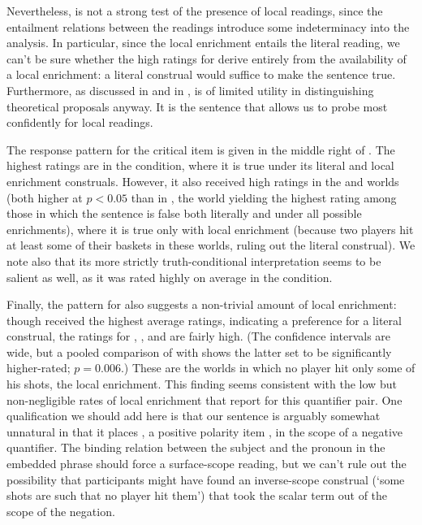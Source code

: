 \documentclass[leqno,12pt]{article}
\begin{document}
Nevertheless,  is not a strong test of the
presence of local readings, since the entailment relations between the
readings introduce some indeterminacy into the analysis. In
particular, since the local enrichment entails the literal reading, we
can't be sure whether the high ratings for  derive entirely
from the availability of a local enrichment: a literal construal would
suffice to make the sentence true. Furthermore, as discussed in
 and in \citeauthor{Chemla:Spector:2011},
 is of limited utility in distinguishing
theoretical proposals anyway. It is the 
sentence that allows us to probe most confidently for local readings.

The response pattern for the critical item 
is given in the middle right of . The highest
ratings are in the  condition, where it is true under its
literal and local enrichment construals. However, it also received
high ratings in the  and  worlds (both higher at
$p<0.05$ than in , the world yielding the highest rating
among those in which the sentence is false both literally and under
all possible enrichments), where it is true only with local enrichment
(because two players hit at least some of their baskets in these
worlds, ruling out the literal construal).  We note also that its more
strictly truth-conditional interpretation seems to be salient as well,
as it was rated highly on average in the  condition.

Finally, the pattern for  also suggests a non-trivial
amount of local enrichment: though  received the highest
average ratings, indicating a preference for a literal construal, the
ratings for , , and  are fairly high.
(The confidence intervals are wide, but a pooled comparison of
 with
 shows the latter set to be
significantly higher-rated; $p = 0.006$.) These are the worlds in which
no player hit only some of his shots, the local enrichment. This
finding seems consistent with the low but non-negligible rates of
local enrichment that  report for
this quantifier pair. One qualification we should add here is that our
sentence is arguably somewhat unnatural in that it places ,
a positive polarity item \citep{Baker70,Israel96}, in the scope of a
negative quantifier. The binding relation between the subject and the
pronoun  in the embedded phrase should force a surface-scope
reading, but we can't rule out the possibility that participants might
have found an inverse-scope construal (`some shots are such that no
player hit them') that took the scalar term out of the scope of the
negation.
\end{document}
